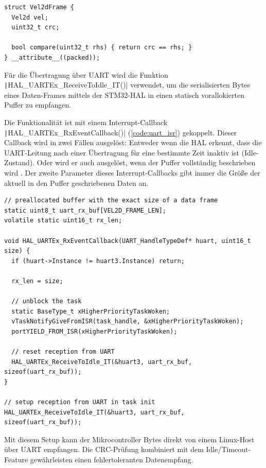 \begin{code}
\begin{verbatim}
struct Vel2dFrame {
  Vel2d vel;
  uint32_t crc;

  bool compare(uint32_t rhs) { return crc == rhs; }
} __attribute__((packed));
\end{verbatim}
    \label{code:vel2d_frame}
\end{code}

Für die Übertragung über UART wird die Funktion
\texttt|HAL_UARTEx_ReceiveToIdle_IT()| verwendet, um die serialisierten
Bytes eines Daten-Frames mittels der STM32-HAL in einen statisch vorallokierten
Puffer zu empfangen.

Die Funktionalität ist mit einem Interrupt-Callback
\texttt|HAL_UARTEx_RxEventCallback()| (\ref{code:uart_isr}) gekoppelt.
Dieser Callback wird in zwei Fällen ausgelöst: Entweder wenn die HAL erkennt,
dass die UART-Leitung nach einer Übertragung für eine bestimmte Zeit inaktiv ist
(Idle-Zustand). Oder wird er auch ausgelöst, wenn der Puffer vollständig
beschrieben wird \cite{HAL_UARTEx_ReceiveToIdle_IT}. Der zweite Parameter dieses
Interrupt-Callbacks gibt immer die Größe der aktuell in den Puffer geschriebenen
Daten an.

\begin{code}
\begin{verbatim}
// preallocated buffer with the exact size of a data frame
static uint8_t uart_rx_buf[VEL2D_FRAME_LEN];
volatile static uint16_t rx_len;

void HAL_UARTEx_RxEventCallback(UART_HandleTypeDef* huart, uint16_t size) {
  if (huart->Instance != huart3.Instance) return;

  rx_len = size;

  // unblock the task
  static BaseType_t xHigherPriorityTaskWoken;
  vTaskNotifyGiveFromISR(task_handle, &xHigherPriorityTaskWoken);
  portYIELD_FROM_ISR(xHigherPriorityTaskWoken);

  // reset reception from UART
  HAL_UARTEx_ReceiveToIdle_IT(&huart3, uart_rx_buf, sizeof(uart_rx_buf));
}

// setup reception from UART in task init
HAL_UARTEx_ReceiveToIdle_IT(&huart3, uart_rx_buf, sizeof(uart_rx_buf));
\end{verbatim}
    \label{code:uart_isr}
\end{code}

Mit diesem Setup kann der Mikrocontroller Bytes direkt von einem Linux-Host über
UART empfangen. Die CRC-Prüfung kombiniert mit dem Idle/Timeout-Feature
gewährleisten einen fehlertoleranten Datenempfang.

